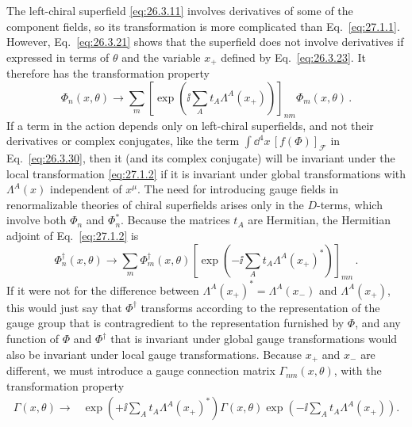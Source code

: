 The left-chiral superfield \eqref{eq:26.3.11} involves derivatives of some
of the component fields, so its transformation is more complicated than
Eq.~\eqref{eq:27.1.1}. However, Eq.~\eqref{eq:26.3.21} shows that the
superfield does not involve derivatives if expressed in terms of
\(\theta\) and the variable \(x_+\) defined by Eq.~\eqref{eq:26.3.23}.
It therefore has the transformation property
\begin{equation}
  \Phi_n(x,\theta)\longrightarrow
  \sum_m\left[
    \exp\left(\ii\sum_A t_A\Lambda^A(x_+)\right)
  \right]_{nm}\Phi_m(x,\theta)\,.
  \tag{27.1.2}\label{eq:27.1.2}
\end{equation}
If a term in the action depends only on left-chiral superfields, and not
their derivatives or complex conjugates, like the term
\(\int \dd^4x\,[f(\Phi)]_{\mathcal{F}}\) in Eq.~\eqref{eq:26.3.30}, then it
(and its complex conjugate) will be invariant under the local
transformation \eqref{eq:27.1.2} if it is invariant under global
transformations with \(\Lambda^A(x)\) independent of \(x^\mu\). The need
for introducing gauge fields in renormalizable theories of chiral
superfields arises only in the \(D\)-terms, which involve both \(\Phi_n\)
and \(\Phi_n^*\). Because the matrices \(t_A\) are Hermitian, the Hermitian
adjoint of Eq.~\eqref{eq:27.1.2} is
\begin{equation}
  \Phi_n^\dagger(x,\theta)\longrightarrow
  \sum_m\Phi_m^\dagger(x,\theta)
  \left[
    \exp\left(-\ii\sum_A t_A\Lambda^A(x_+)^*\right)
  \right]_{mn}\,.
  \tag{27.1.3}\label{eq:27.1.3}
\end{equation}
If it were not for the difference between
\(\Lambda^A(x_+)^*=\Lambda^A(x_-)\) and \(\Lambda^A(x_+)\), this would
just say that \(\Phi^\dagger\) transforms according to the representation
of the gauge group that is contragredient to the representation furnished
by \(\Phi\), and any function of \(\Phi\) and \(\Phi^\dagger\) that is
invariant under global gauge transformations would also be invariant under
local gauge transformations. Because \(x_+\) and \(x_-\) are different, we
must introduce a gauge connection matrix \(\Gamma_{nm}(x,\theta)\), with
the transformation property
\begin{equation}
  \begin{split}
  \Gamma(x,\theta)\longrightarrow{}&
  \exp\left(+\ii\sum_A t_A\Lambda^A(x_+)^*\right)
  \Gamma(x,\theta)
  \exp\left(-\ii\sum_A t_A\Lambda^A(x_+)\right).
  \end{split}
  \tag{27.1.4}\label{eq:27.1.4}
\end{equation}
